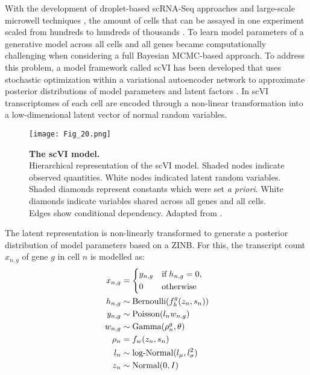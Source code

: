 With the development of droplet-based scRNA-Seq approaches \citep{Macosko2015, Klein2015} and large-scale microwell techniques \citep{Han2018}, the amount of cells that can be assayed in one experiment scaled from hundreds to hundreds of thousands \citep{Svensson2018}. To learn model parameters of a generative model across all cells and all genes became computationally challenging when considering a full Bayesian MCMC-based approach. To address this problem, a model framework called \gls{scVI} has been developed that uses stochastic optimization within a variational autoencoder network to approximate posterior distributions of model parameters and latent factors \citep{Lopez2018}. In scVI transcriptomes of each cell are encoded through a non-linear transformation into a low-dimensional latent vector of normal random variables. \\

\begin{wrapfigure}{r}{0.5\textwidth}
\centering    
\texttt{[image: Fig\_20.png]}
\caption[The scVI model.]{\textbf{The scVI model.} \\
Hierarchical representation of the scVI model. Shaded nodes indicate observed quantities. White nodes indicated latent random variables. Shaded diamonds represent constants which were set \emph{a priori}. White diamonds indicate variables shared across all genes and all cells. Edges show conditional dependency. Adapted from \citep{Lopez2018}.}
\label{fig0:scVI}
\vspace{-60mm}
\end{wrapfigure}

The latent representation is non-linearly transformed to generate a posterior distribution of model parameters based on a ZINB. For this, the transcript count $x_{n,g}$ of gene $g$ in cell $n$ is modelled as:\\

\begin{align*}
x_{n,g} & = 
 \left\lbrace
  \begin{aligned}
    & y_{n,g} && \textnormal{if} \; h_{n,g} = 0,  \\ 
    & 0 && \textnormal{otherwise}    	    
  \end{aligned}
\right.\\
h_{n,g} & \sim \textnormal{Bernoulli}(f_h^g(z_n,s_n))\\
y_{n,g} & \sim \textnormal{Poisson}(l_nw_{n.g})\\
w_{n,g} & \sim \textnormal{Gamma}(\rho^g_n, \theta)\\
\rho_n & = f_w(z_n,s_n)\\
l_n & \sim \textnormal{log-Normal}(l_{\mu},l^2_{\sigma})\\
z_n & \sim \textnormal{Normal}(0,I)
\end{align*}


